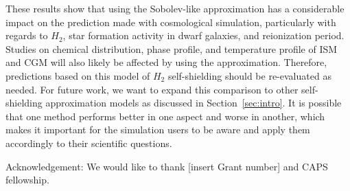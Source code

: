 \documentclass[linenumbers, twocolumn]{aastex631}
\begin{document}
These results show that using the Sobolev-like approximation has a considerable impact on the prediction made with cosmological simulation, particularly with regards to $H_{2}$, star formation activity in dwarf galaxies, and reionization period. Studies on chemical distribution, phase profile, and temperature profile of ISM and CGM will also likely be affected by using the approximation. Therefore, predictions based on this model of $H_{2}$ self-shielding should be re-evaluated as needed. For future work, we want to expand this comparison to other self-shielding approximation models as discussed in Section~\ref{sec:intro}. It is possible that one method performs better in one aspect and worse in another, which makes it important for the simulation users to be aware and apply them accordingly to their scientific questions.


\begin{acknowledgments}
Acknowledgement: We would like to thank [insert Grant number] and CAPS fellowship. 
\end{acknowledgments}

%

\vspace{5mm}

\end{document}
